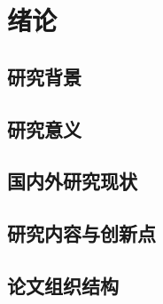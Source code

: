 \section{绪论}

\subsection{研究背景}

\subsection{研究意义}

\subsection{国内外研究现状}

\subsection{研究内容与创新点}


\subsection{论文组织结构}
